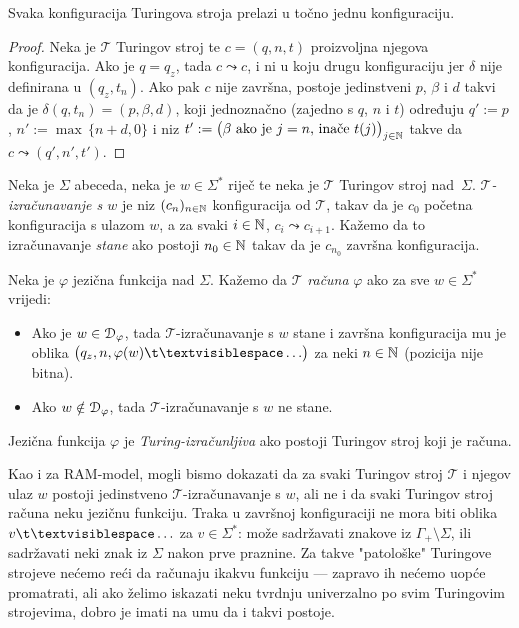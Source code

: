 \begin{lema}[{name=[determinističnost Turingovih strojeva]}]\label{lm:Turingdet}
Svaka konfiguracija Turingova stroja prelazi u točno jednu konfiguraciju.%
\end{lema}
\begin{proof}
	Neka je $\mathcal T$ Turingov stroj te $c=(q,n,t)$ proizvoljna njegova konfiguracija. Ako je $q=q_z$, tada $c\leadsto c$, i ni u koju drugu konfiguraciju jer $\delta$ nije definirana u $(q_z,t_n)$. Ako pak $c$ nije završna, postoje jedinstveni $p$, $\beta$ i $d$ takvi da je $\delta(q,t_n)=(p,\beta,d)$, koji jednoznačno (zajedno s $q$, $n$ i $t$) određuju $q':=p$, $n':=\max\,\{n+d,0\}$ i niz $t':=\bigl(\text{$\beta$ ako je $j=n$, inače $t(j)$}\bigl)_{j\in{\mathbb N}}$ takve da $c\leadsto(q',n',t')$.
\end{proof}

\begin{definicija}[{name=[Turing-izračunljiva jezična funkcija]}]\label{def:Tcomputefi}
Neka je $\Sigma$ abeceda, neka je $w\in\Sigma^*$ riječ te neka je $\mathcal T$ Turingov stroj nad~$\Sigma$. \emph{$\mathcal T$\!-izračunavanje s $w$} je niz $(c_n)_{n\in{\mathbb N}}$ konfiguracija od $\mathcal T$, takav da je $c_0$ početna konfiguracija s ulazom $w$, a za svaki $i\in{\mathbb N}$, $c_i\leadsto c_{i+1}$. Kažemo da to izračunavanje \emph{stane} ako postoji $n_0\in{\mathbb N}$ takav da je $c_{n_0}$ završna konfiguracija.

Neka je $\varphi$ jezična funkcija nad $\Sigma$. Kažemo da $\mathcal T$ \emph{\!računa} $\varphi$ ako za sve $w\in\Sigma^*$ vrijedi:
\begin{itemize}
    \item Ako je $w\in\mathcal D_{\varphi}$, tada $\mathcal T$\!-izračunavanje s $w$ stane i završna konfiguracija mu je oblika $\bigl(q_z,n,\varphi(w)\bl\ldots\bigr)$ za neki $n\in{\mathbb N}$ (pozicija nije bitna).
    \item Ako $w\notin\mathcal D_{\varphi}$, tada $\mathcal T$\!-izračunavanje s $w$ ne stane.
\end{itemize}
Jezična funkcija $\varphi$ je \emph{Turing-izračunljiva} ako postoji Turingov stroj koji je računa.
\end{definicija}

Kao i za RAM-model, mogli bismo dokazati da za svaki Turingov stroj $\mathcal T$ i njegov ulaz $w$ postoji jedinstveno $\mathcal T$\!-izračunavanje s $w$, ali ne i da svaki Turingov stroj računa neku jezičnu funkciju. Traka u završnoj konfiguraciji ne mora biti oblika $v\bl\ldots$ za $v\in\Sigma^*$: može sadržavati znakove iz $\Gamma_+\!\setminus\Sigma$, ili sadržavati neki znak iz $\Sigma$ nakon prve praznine. Za takve "patološke" Turingove strojeve nećemo reći da računaju ikakvu funkciju --- zapravo ih nećemo uopće promatrati, ali ako želimo iskazati neku tvrdnju univerzalno po svim Turingovim strojevima, dobro je imati na umu da i takvi postoje.

